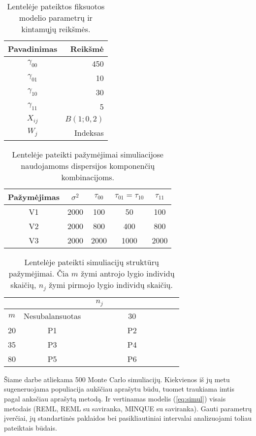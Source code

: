 \documentclass[12pt,a4paper]{article}
\begin{document}
\begin{table}[ht]
\centering
\begin{tabular}{|c|r|}
\hline
Pavadinimas & Reikšmė\\
\hline
$\gamma_{00}$& 450  \\
$\gamma_{01}$& 10  \\
$\gamma_{10}$& 30 \\
$\gamma_{11}$& 5  \\
$X_{ij}$ &  $B\left(1; 0,2\right)$ \\
$W_{j}$ &  Indeksas \\
\hline
\end{tabular}
\caption{Lentelėje pateiktos fiksuotos modelio parametrų ir kintamųjų reikšmės.}
\label{table:fixed}
\end{table}

\begin{table}[ht]
\centering
\begin{tabular}{|c|cccc|}
\hline
 Pažymėjimas & $\sigma^2$&$\tau_{00}$&$\tau_{01}=\tau_{10}$&$\tau_{11}$\\
\hline
V1&2000&100&50&100\\
V2&2000&800&400&800\\
V3&2000&2000&1000&2000\\
\hline
\end{tabular}
\caption{Lentelėje pateikti pažymėjimai simuliacijose naudojamoms dispersijos komponenčių kombinacijoms.}
\label{table:struct2}
\end{table}

\begin{table}[ht]
\centering
\begin{tabular}{|c|cc|}
\hline
 & \multicolumn{2}{c|}{$n_j$}\\
\hline
$m$& Nesubalansuotas & \ \ \ \ \ \ \ \ \ \ 30\ \ \ \ \ \ \ \ \ \ \\
\hline
20& P1&P2\\
35&P3&P4\\
80& P5&P6\\
\hline
\end{tabular}
\caption{Lentelėje pateikti simuliacijų struktūrų pažymėjimai. Čia $m$ žymi antrojo lygio individų skaičių, $n_j$ žymi pirmojo lygio individų skaičių.}
\label{table:struct1}
\end{table}



\indent Šiame darbe atliekama 500 Monte Carlo simuliacijų. Kiekvienos iš jų metu sugeneruojama populiacija aukščiau aprašytu būdu, tuomet traukiama imtis pagal anksčiau aprašytą metodą. Ir vertinamas modelis (\ref{eq:simul}) visais metodais (REML, REML su saviranka, MINQUE su saviranka). Gauti parametrų įverčiai, jų standartinės paklaidos bei pasikliautiniai intervalai analizuojami toliau pateiktais būdais.
\end{document}
